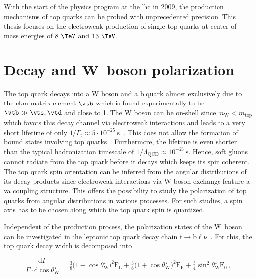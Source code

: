 With the start of the physics program at the \gls{lhc} in 2009, the production mechanisms of top quarks can be probed with unprecedented precision. This thesis focuses on the electroweak production of single top quarks at center-of-mass energies of $8~\TeV$ and $13~\TeV$.


\section{Decay and W~boson polarization}
\label{sec:theory-top-quark-decay}

The top quark decays into a W boson and a b quark almost exclusively due to the \gls{ckm} matrix element $\vtb$ which is found experimentally to be $\vtb\gg\vts,\vtd$ and close to 1. The W boson can be on-shell since $m_\mathrm{W}<m_\mathrm{top}$ which favors this decay channel via electroweak interactions and leads to a very short lifetime of only $1/\Gamma_\mathrm{t}\approx 5\cdot10^{-25}~\mathrm{s}$~\cite{Olive:2016xmw}. This does not allow the formation of bound states involving top quarks~\cite{BIGI1986157}. Furthermore, the lifetime is even shorter than the typical hadronization timescale of $1/\Lambda_\mathrm{QCD}\approx 10^{-23}~\mathrm{s}$. Hence, soft gluons cannot radiate from the top quark before it decays which keeps its spin coherent. The top quark spin orientation can be inferred from the angular distributions of its decay products since electroweak interactions via $\mathrm{W}$ boson exchange feature a \gls{va} coupling structure. This offers the possibility to study the polarization of top quarks from angular distributions in various processes. For such studies, a spin axis has to be chosen along which the top quark spin is quantized.

Independent of the production process, the polarization states of the $\mathrm{W}$~boson can be investigated in the leptonic top quark decay chain $\mathrm{t}\to\mathrm{b}\ell\nu$~\cite{AguilarSaavedra:2010nx}. For this, the top quark decay width is decomposed into

\begin{equation}
\frac{\mathrm{d}\Gamma}{\Gamma\cdot\mathrm{d}\cos\theta^\star_\mathrm{W}}=\tfrac{3}{8}\big(1-\cos\theta^\star_\mathrm{W}\big)^{2}\mathrm{F}_\mathrm{L}+\tfrac{3}{8}\big(1+\cos\theta^\star_\mathrm{W}\big)^{2}\mathrm{F}_\mathrm{R}+\tfrac{3}{4}\sin^{2}\theta^\star_\mathrm{W}\mathrm{F}_{0}\,, \label{eq:theory-diff-whel-fractions}
\end{equation}

